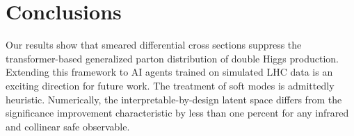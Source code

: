 \section{Conclusions}\label{sec:conclusions}

Our results show that smeared differential cross sections suppress the
transformer-based generalized parton distribution of double Higgs
production. Extending this framework to AI agents trained on simulated
LHC data is an exciting direction for future work. The treatment of soft
modes is admittedly heuristic. Numerically, the interpretable-by-design
latent space differs from the significance improvement characteristic by
less than one percent for any infrared and collinear safe observable.


